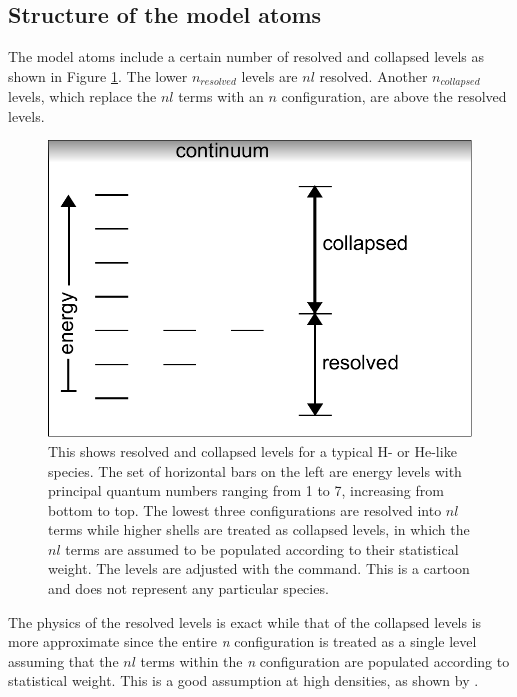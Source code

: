 \subsection{Structure of the model atoms}

The model atoms include a certain number of resolved and collapsed levels
as shown in Figure \ref{fig:LevelsResolvedCollapsed}.
The lower $n_{resolved}$ levels are $nl$ resolved.
Another $n_{collapsed}$ levels,
which replace the $nl$ terms with an $n$ configuration,
are above the resolved levels.

\begin{figure}
\centering
\includegraphics[scale=0.7]{LevelsResolvedCollapsed}
\caption[Resolved and collapsed levels]
{\label{fig:LevelsResolvedCollapsed}This shows  
resolved and collapsed levels for a typical H- or He-like species.
The set of horizontal bars on the left are energy levels with
principal quantum numbers ranging from 1 to 7, increasing from bottom to top.
The lowest three configurations are resolved into $nl$ terms while
higher shells are treated as collapsed levels, in which the $nl$ terms
are assumed to be populated according to their statistical weight.
The levels are adjusted with the  command.
This is a cartoon and does not represent any particular species.}
\end{figure}

The physics of the resolved levels is exact while that of the
collapsed levels is more approximate since the entire \emph{n} configuration is
treated as a single level assuming that the $nl$ terms within the \emph{n} configuration 
are populated according to statistical weight.
This is a good assumption at high densities, as
shown by \citet{PengellySeaton1964}.

